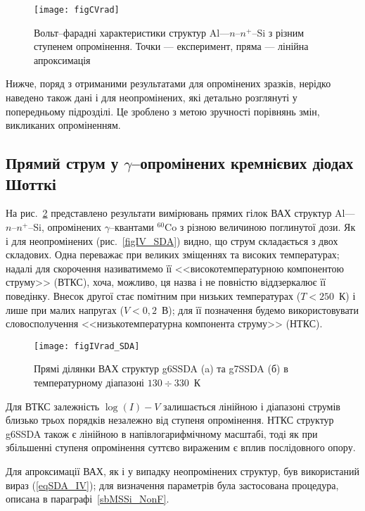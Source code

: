 \begin{figure}
\center
\texttt{[image: figCVrad]}
\caption{\label{figCVrad}
Вольт--фарадні характеристики структур Al---$n$--$n^+$--Si з різним ступенем опромінення.
Точки --- експеримент, пряма --- лінійна апроксимація
}%
\end{figure}


Нижче, поряд з отриманими результатами для опромінених зразків, нерідко наведено також дані і для неопромінених,
які детально розглянуті у попередньому підрозділі.
Це зроблено з метою зручності порівнянь змін, викликаних опроміненням.


\subsection{Прямий струм у $\gamma$--опромінених кремнієвих діодах Шотткі}

На рис.~\ref{figIVrad_SDA} представлено результати вимірювань прямих гілок ВАХ структур Al---$n$--$n^+$--Si, опромінених
$\gamma$--квантами $^{60}$Co з різною величиною поглинутої дози.
Як і для неопромінених (рис.~\ref{figIV_SDA}) видно, що струм складається з двох складових.
Одна переважає при великих зміщеннях та високих температурах; надалі для скорочення називатимемо її
<<високотемпературною компонентою струму>> (ВТКС), хоча, можливо, ця назва і не повністю віддзеркалює її поведінку.
Внесок другої стає помітним при низьких температурах ($T<250$~К) і лише при малих напругах ($V<0,2$~В);
для її позначення будемо використовувати словосполучення <<низькотемпературна компонента струму>> (НТКС).


\begin{figure}
\center
\texttt{[image: figIVrad\_SDA]}
\caption{\label{figIVrad_SDA}
Прямі  ділянки ВАХ структур g6SSDA (a)  та g7SSDA (б) в температурному діапазоні $130\div330$~К
}%
\end{figure}

Для ВТКС залежність $\log(I)-V$ залишається лінійною і діапазоні струмів близько трьох порядків незалежно від ступеня опромінення.
НТКС структур g6SSDA також є лінійною в напівлогарифмічному масштабі, тоді як при
збільшенні ступеня опромінення суттєво вираженим є вплив послідовного опору.

Для апроксимації ВАХ, як і у випадку неопромінених структур, був використаний вираз (\ref{eqSDA_IV});
для визначення параметрів була застосована процедура, описана в параграфі~\ref{sbMSSi_NonF}.

